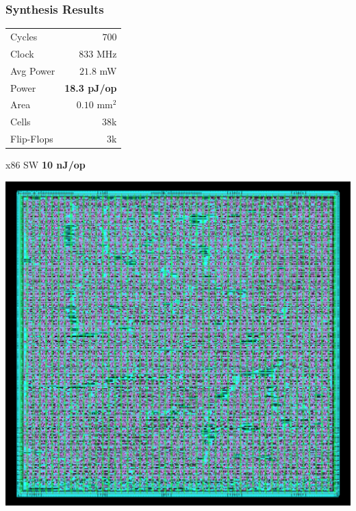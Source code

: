 \documentclass{beamer}
\begin{document}
\begin{frame}
  \frametitle{Synthesis Results}

  \begin{center}
    \begin{vwcol}[widths={0.4,0.5}, rule=0pt]
      \begin{tabular}{lr}
        Cycles & $700$ \\
        Clock & $833$ MHz \\
        Avg Power & $21.8$ mW \\
        Power & \textbf{18.3 pJ/op} \\
        Area & $0.10$ $\mathrm{mm}^2$ \\
        Cells & 38k \\
        Flip-Flops & 3k \\
      \end{tabular}

      \vspace{3em}
      x86 SW \textbf{10 nJ/op}

      \includegraphics[width=0.5\linewidth]{mod_invert.png}
    \end{vwcol}
  \end{center}
\end{frame}
\end{document}
